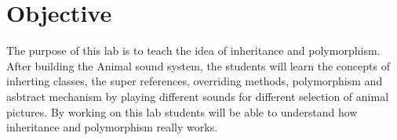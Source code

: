 \section{Objective}

The purpose of this lab is to teach the idea of inheritance and polymorphism. After building the Animal sound system, the students will learn the concepts of inherting classes, the super references, overriding methods, polymorphism and asbtract mechanism by playing different sounds for different selection of animal pictures. By working on this lab students will be able to understand how inheritance and polymorphism really works.

